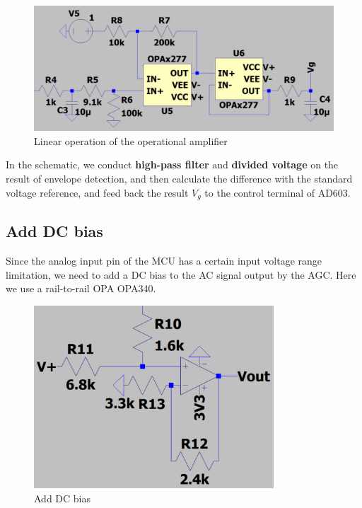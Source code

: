 \begin{figure}[H]
\centering
\includegraphics[width=1\textwidth]{./2023Mar/difference.png}
\caption{Linear operation of the operational amplifier}
\label{difference}
\end{figure}


In the schematic, we conduct \textbf{high-pass filter} and \textbf{divided voltage} on the result of envelope detection, and then calculate the difference with the standard voltage reference, and feed back the result $V_g$ to the control terminal of AD603.

\subsection*{Add DC bias}

Since the analog input pin of the MCU has a certain input voltage range limitation, we need to add a DC bias to the AC signal output by the AGC. Here we use a rail-to-rail OPA OPA340.

\begin{figure}[H]
\centering
\includegraphics[width=0.8\textwidth]{./2023Mar/AddDC.png}
\caption{Add DC bias}
\label{Add DC}
\end{figure}

